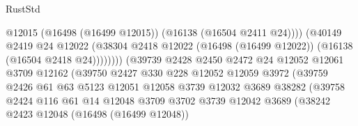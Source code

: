 \begin{lexlean}{RustStd}
\begin{coremodule}
                                              @12015
                                              (@16498 (@16499 @12015))
                                              (@16138 (@16504 @2411 @24))))
                                          (@40149
                                            @2419
                                            @24
                                            @12022
                                            (@38304
                                              @2418
                                              @12022
                                              (@16498 (@16499 @12022))
                                              (@16138 (@16504 @2418 @24))))))))
                                  (@39739
                                    @2428
                                    @2450
                                    @2472
                                    @24
                                    @12052
                                    @12061
                                    @3709
                                    @12162
                                    (@39750
                                      @2427
                                      @330
                                      @228
                                      @12052
                                      @12059
                                      @3972
                                      (@39759
                                        @2426
                                        @61
                                        @63
                                        @5123
                                        @12051
                                        @12058
                                        @3739
                                        @12032
                                        @3689
                                        @38282
                                        (@39758
                                          @2424
                                          @116
                                          @61
                                          @14
                                          @12048
                                          @3709
                                          @3702
                                          @3739
                                          @12042
                                          @3689
                                          (@38242
                                            @2423
                                            @12048
                                            (@16498 (@16499 @12048))

\end{coremodule}
\end{lexlean}
